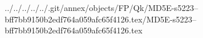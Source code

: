 ../../../../../.git/annex/objects/FP/Qk/MD5E-s5223--bff7bb9150b2edf764a059afc65f4126.tex/MD5E-s5223--bff7bb9150b2edf764a059afc65f4126.tex